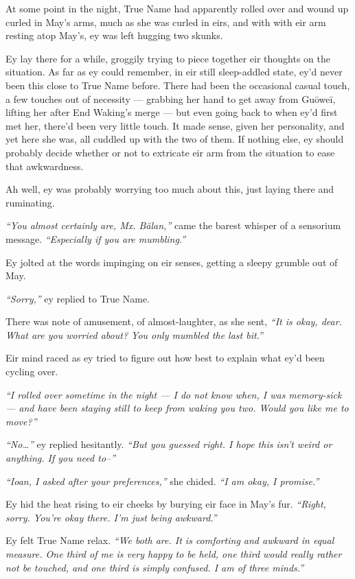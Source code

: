 At some point in the night, True Name had apparently rolled over and wound up curled in May's arms, much as she was curled in eirs, and with with eir arm resting atop May's, ey was left hugging two skunks.

Ey lay there for a while, groggily trying to piece together eir thoughts on the situation. As far as ey could remember, in eir still sleep-addled state, ey'd never been this close to True Name before. There had been the occasional casual touch, a few touches out of necessity — grabbing her hand to get away from Guōweī, lifting her after End Waking's merge — but even going back to when ey'd first met her, there'd been very little touch. It made sense, given her personality, and yet here she was, all cuddled up with the two of them. If nothing else, ey should probably decide whether or not to extricate eir arm from the situation to ease that awkwardness.

Ah well, ey was probably worrying too much about this, just laying there and ruminating.

\emph{``You almost certainly are, Mx. Bălan,''} came the barest whisper of a sensorium message. \emph{``Especially if you are mumbling.''}

Ey jolted at the words impinging on eir senses, getting a sleepy grumble out of May.

\emph{``Sorry,''} ey replied to True Name.

There was note of amusement, of almost-laughter, as she sent, \emph{``It is okay, dear. What are you worried about? You only mumbled the last bit.''}

Eir mind raced as ey tried to figure out how best to explain what ey'd been cycling over.

\emph{``I rolled over sometime in the night — I do not know when, I was memory-sick — and have been staying still to keep from waking you two. Would you like me to move?''}

\emph{``No\ldots{}''} ey replied hesitantly. \emph{``But you guessed right. I hope this isn't weird or anything. If you need to--''}

\emph{``Ioan, I asked after your preferences,''} she chided. \emph{``I am okay, I promise.''}

Ey hid the heat rising to eir cheeks by burying eir face in May's fur. \emph{``Right, sorry. You're okay there. I'm just being awkward.''}

Ey felt True Name relax. \emph{``We both are. It is comforting and awkward in equal measure. One third of me is very happy to be held, one third would really rather not be touched, and one third is simply confused. I am of three minds.''}

